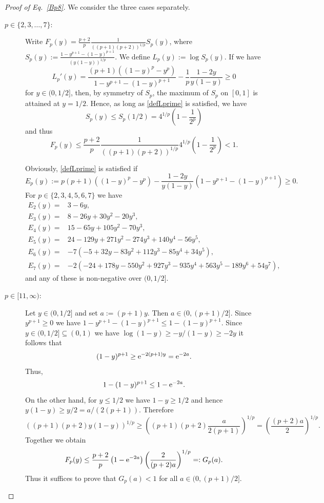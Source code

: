 \documentclass[12pt]{article}
\theoremstyle{remark}
\theoremstyle{definition}
\newcommand{\<}{\langle}
\renewcommand{\>}{\rangle}
\begin{document}
\begin{appendix}
\begin{proof}[Proof of Eq.~\eqref{Bp8}]
We consider the three cases separately.
\begin{description}
\item[$p \in \{2,3,\ldots,7\}$:] Write $F_p(y)=\frac{p+2}{p} \frac{1}{((p+1)(p+2))^{1/p}} S_p(y)$, where $S_p(y):=\frac{1-y^{p+1}-(1-y)^{p+1}}{(y(1-y))^{1/p}}$. We define  $L_p(y):=\log S_p(y)$. If we have
\begin{equation}\label{defLprime}
L_p'(y) =\frac{(p+1)((1-y)^p-y^p)}{1-y^{p+1}-(1-y)^{p+1}}-\frac{1}{p} \frac{1-2 y}{y(1-y)}\ge 0
\end{equation}
for $y \in (0,1/2]$, then, by symmetry of $S_p$, the maximum of $S_p$ on $[0,1]$ is attained at $y=1/2$. Hence, as long as \eqref{defLprime} is satisfied, we have 
$$
   S_p(y)\le S_p(1/2)=4^{1/p}\left(1-\frac1{2^p}\right)
$$
and thus $$F_p(y) \le \frac{p+2}{p} \frac{1}{((p+1)(p+2))^{1/p}} 4^{1/p} \left(1-\frac{1}{2^p}\right) < 1.$$

Obviously, \eqref{defLprime} is satisfied if $$E_p(y):=p (p+1)((1-y)^p-y^p)-\frac{1-2 y}{y(1-y)}(1-y^{p+1}-(1-y)^{p+1}) \ge 0.$$
For $p\in \{2,3,4,5,6,7\}$ we have 
\begin{align*}
E_2(y) = & 3-6y,\\
E_3(y) = & 8-26 y+30y^2-20 y^3,\\
E_4(y) = & 15-65 y+105 y^2-70y^3,\\
E_5(y) = & 24-129 y+271 y^2-274 y^3+140 y^4-56 y^5,\\
E_6(y) = & -7(-5+32 y-83 y^2+112 y^3-85 y^4+34 y^5),\\
E_7(y) = & -2(-24+178y-550 y^2+927 y^3-935 y^4+563 y^5-189 y^6+54 y^7),
\end{align*}
and any of these is non-negative over $(0,1/2]$.

\item[$p \in [11,\infty)$:] Let $y \in (0,1/2]$ and set $a:=(p+1) y$. Then $a \in (0,(p+1)/2]$. Since $y^{p+1}\ge 0$ we have $1-y^{p+1}-(1-y)^{p+1} \le 1-(1-y)^{p+1}$. Since $y \in (0,1/2] \subseteq (0,1)$ we have $\log(1-y)\ge -y/(1-y) \ge -2 y$ it follows that $$(1-y)^{p+1} \ge {\rm e}^{-2(p+1) y}={\rm e}^{-2a}.$$ Thus, $$1-(1-y)^{p+1} \le 1-{\rm e}^{-2 a}.$$ On the other hand, for $y \le 1/2$ we have $1-y \ge 1/2$ and hence $y(1-y) \ge y/2=a/(2(p+1))$. Therefore $$((p+1)(p+2) y (1-y))^{1/p} \ge \left((p+1)(p+2)\frac{a}{2(p+1)} \right)^{1/p}= \left(\frac{(p+2) a}{2} \right)^{1/p}.$$ Together we obtain
\begin{equation}\label{def:Gp}
F_p(y) \le \frac{p+2}{p} \left(1-{\rm e}^{-2 a}\right)\left(\frac{2}{(p+2)a}\right)^{1/p}=:G_p(a).
\end{equation}
Thus it suffices to prove that $G_p(a) < 1$ for all $a \in (0,(p+1)/2]$. 


\end{description}
\end{proof}
\end{appendix}
\end{document}
